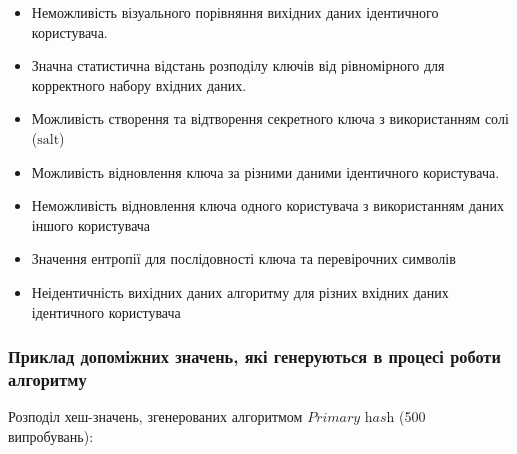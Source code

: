 \documentclass[11pt]{article}
\providecommand{\tightlist}{%
      \setlength{\itemsep}{0pt}\setlength{\parskip}{0pt}}
\begin{document}
\begin{itemize}
  \begin{itemize}
  \tightlist
  \item
    Неможливість візуального порівняння вихідних даних ідентичного
    користувача.
    \vspace{1ex}
  \item
    Значна статистична відстань розподілу ключів від рівномірного для
    корректного набору вхідних даних.
    \vspace{1ex}
  \item
    Можливість створення та відтворення секретного ключа з використанням
    солі (\(\text{salt}\))
    \vspace{1ex}
  \item
    Можливість відновлення ключа за різними даними ідентичного
    користувача.
    \vspace{1ex}
  \item
    Неможливість відновлення ключа одного користувача з використанням
    даних іншого користувача
    \vspace{1ex}
  \item
    Значення ентропії для послідовності ключа та перевірочних символів
    \vspace{1ex}
  \item
    Неідентичність вихідних даних алгоритму для різних вхідних даних
    ідентичного користувача
    \vspace{1ex}
  \end{itemize}
\end{itemize}

    \hypertarget{ux43fux440ux438ux43aux43bux430ux434-ux434ux43eux43fux43eux43cux456ux436ux43dux438ux445-ux437ux43dux430ux447ux435ux43dux44c-ux44fux43aux456-ux433ux435ux43dux435ux440ux443ux44eux442ux44cux441ux44f-ux432-ux43fux440ux43eux446ux435ux441ux456-ux440ux43eux431ux43eux442ux438-ux430ux43bux433ux43eux440ux438ux442ux43cux443}{%
\subsubsection{Приклад допоміжних значень, які генеруються в процесі
роботи
алгоритму}\label{ux43fux440ux438ux43aux43bux430ux434-ux434ux43eux43fux43eux43cux456ux436ux43dux438ux445-ux437ux43dux430ux447ux435ux43dux44c-ux44fux43aux456-ux433ux435ux43dux435ux440ux443ux44eux442ux44cux441ux44f-ux432-ux43fux440ux43eux446ux435ux441ux456-ux440ux43eux431ux43eux442ux438-ux430ux43bux433ux43eux440ux438ux442ux43cux443}}

    Розподіл хеш-значень, згенерованих алгоритмом \(\textit{Primary hash}\)
(500 випробувань):
\end{document}
